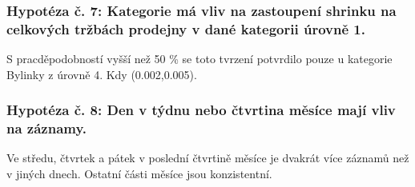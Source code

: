 \subsubsection*{Hypotéza č. 7: Kategorie má vliv na zastoupení shrinku na celkových tržbách prodejny v dané kategorii úrovně 1.}

S pracděpodobností vyšší než 50 \% se toto tvrzení potvrdilo pouze u kategorie Bylinky z úrovně 4. Kdy (0.002,0.005).

\subsubsection*{Hypotéza č. 8: Den v týdnu nebo čtvrtina měsíce mají vliv na záznamy.}

Ve středu, čtvrtek a pátek v poslední čtvrtině měsíce je dvakrát více záznamů než v jiných dnech. Ostatní části měsíce jsou konzistentní.